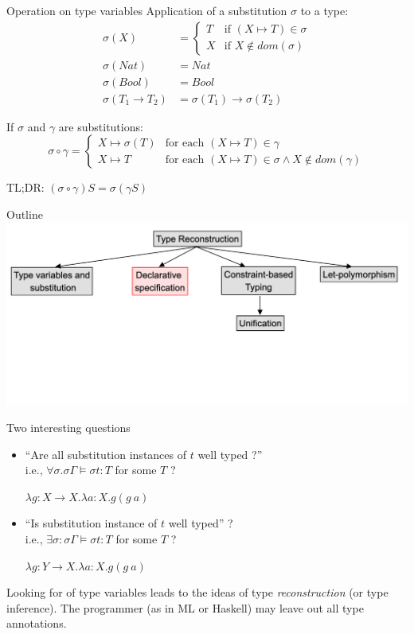 \documentclass[usenames,dvipsnames]{beamer}
\begin{document}
\begin{frame}{Operation on type variables}
Application of a substitution $\sigma$ to a type:
\begin{align*}
\sigma(X) &= \begin{cases}
T & \text{if } (X \mapsto T) \in \sigma\\
X & \text{if } X \not\in dom(\sigma)
\end{cases}\\
\sigma(Nat) &= Nat\\
\sigma(Bool) &= Bool\\
\sigma(T_1 \rightarrow T_2) &= \sigma(T_1) \rightarrow \sigma(T_2)
\end{align*}


If $\sigma$ and $\gamma$ are substitutions:
$$\sigma \circ \gamma = \begin{cases}
X \mapsto \sigma(T)& \text{for each } (X \mapsto T)\in \gamma\\
X \mapsto T & \text{for each } (X \mapsto T) \in\sigma \wedge X \not\in dom(\gamma)
\end{cases} $$

TL;DR: $(\sigma \circ \gamma )S=\sigma(\gamma S)$
\end{frame}

\begin{frame}{Outline}
\includegraphics[scale=0.25]{img/3}
\end{frame}
\begin{frame}{Two interesting questions}
\begin{itemize}
\item ``Are \alert{all} substitution instances of $t$ well typed ?''\\
  i.e., $\forall \sigma. \sigma\Gamma \models \sigma t: T$ for some $T$ ?
\begin{example}
$\lambda g: X \rightarrow X.  \lambda a: X. g(g\ a)$
\end{example}
\item ``Is  substitution instance of $t$ well typed'' ? \\
  i.e., $\exists \sigma: \sigma\Gamma \models \sigma t: T$ for some $T$ ?
\begin{example}
$\lambda g: Y \rightarrow X.  \lambda a: X. g(g\ a)$
\end{example}

\end{itemize}
Looking for  of type variables leads to the ideas of type \textit{reconstruction} (or type inference). The programmer (as in ML or Haskell) may leave out all type annotations.
\end{frame}
\end{document}
